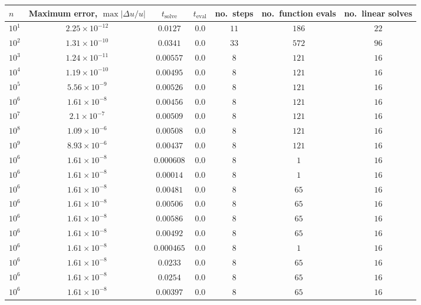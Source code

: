 \begin{tabular}{l c c c c c c}
\hline \hline 
    $n$  &  Maximum error, $\max|\Delta u/u|$  &  $t_{\mathrm{solve}}$  &  $t_{\mathrm{eval}}$  &  no.\ steps  & no.\ function evals  &  no.\ linear solves  \\ \hline
$10^1$  &  $2.25 \times 10^{-12}$  &  $0.0127$  &  $0.0$  &  $11$  &  $186$  &  $22$ \\ 
$10^2$  &  $1.31 \times 10^{-10}$  &  $0.0341$  &  $0.0$  &  $33$  &  $572$  &  $96$ \\ 
$10^3$  &  $1.24 \times 10^{-11}$  &  $0.00557$  &  $0.0$  &  $8$  &  $121$  &  $16$ \\ 
$10^4$  &  $1.19 \times 10^{-10}$  &  $0.00495$  &  $0.0$  &  $8$  &  $121$  &  $16$ \\ 
$10^5$  &  $5.56 \times 10^{-9}$  &  $0.00526$  &  $0.0$  &  $8$  &  $121$  &  $16$ \\ 
$10^6$  &  $1.61 \times 10^{-8}$  &  $0.00456$  &  $0.0$  &  $8$  &  $121$  &  $16$ \\ 
$10^7$  &  $2.1 \times 10^{-7}$  &  $0.00509$  &  $0.0$  &  $8$  &  $121$  &  $16$ \\ 
$10^8$  &  $1.09 \times 10^{-6}$  &  $0.00508$  &  $0.0$  &  $8$  &  $121$  &  $16$ \\ 
$10^9$  &  $8.93 \times 10^{-6}$  &  $0.00437$  &  $0.0$  &  $8$  &  $121$  &  $16$ \\ 
$10^6$  &  $1.61 \times 10^{-8}$  &  $0.000608$  &  $0.0$  &  $8$  &  $1$  &  $16$ \\ 
$10^6$  &  $1.61 \times 10^{-8}$  &  $0.00014$  &  $0.0$  &  $8$  &  $1$  &  $16$ \\ 
$10^6$  &  $1.61 \times 10^{-8}$  &  $0.00481$  &  $0.0$  &  $8$  &  $65$  &  $16$ \\ 
$10^6$  &  $1.61 \times 10^{-8}$  &  $0.00506$  &  $0.0$  &  $8$  &  $65$  &  $16$ \\ 
$10^6$  &  $1.61 \times 10^{-8}$  &  $0.00586$  &  $0.0$  &  $8$  &  $65$  &  $16$ \\ 
$10^6$  &  $1.61 \times 10^{-8}$  &  $0.00492$  &  $0.0$  &  $8$  &  $65$  &  $16$ \\ 
$10^6$  &  $1.61 \times 10^{-8}$  &  $0.000465$  &  $0.0$  &  $8$  &  $1$  &  $16$ \\ 
$10^6$  &  $1.61 \times 10^{-8}$  &  $0.0233$  &  $0.0$  &  $8$  &  $65$  &  $16$ \\ 
$10^6$  &  $1.61 \times 10^{-8}$  &  $0.0254$  &  $0.0$  &  $8$  &  $65$  &  $16$ \\ 
$10^6$  &  $1.61 \times 10^{-8}$  &  $0.00397$  &  $0.0$  &  $8$  &  $65$  &  $16$ \\ 

\end{tabular}
